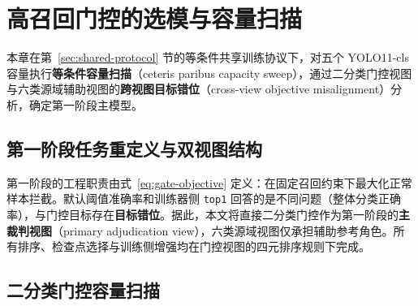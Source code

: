 \documentclass[UTF8,openany,12pt]{ctexbook}
\newcommand{\formalmetric}[1]{\texttt{#1}}
\begin{document}
\chapter{高召回门控的选模与容量扫描}

\noindent 本章在第~\ref{sec:shared-protocol} 节的等条件共享训练协议下，对五个 YOLO11-cls 容量执行\textbf{等条件容量扫描}（ceteris paribus capacity sweep），通过二分类门控视图与六类源域辅助视图的\textbf{跨视图目标错位}（cross-view objective misalignment）分析，确定第一阶段主模型。

\section{第一阶段任务重定义与双视图结构}
第一阶段的工程职责由式~\eqref{eq:gate-objective} 定义：在固定召回约束下最大化正常样本拦截。默认阈值准确率和训练器侧 \formalmetric{top1} 回答的是不同问题（整体分类正确率），与门控目标存在\textbf{目标错位}。据此，本文将直接二分类门控作为第一阶段的\textbf{主裁判视图}（primary adjudication view），六类源域视图仅承担辅助参考角色。所有排序、检查点选择与训练侧增强均在门控视图的四元排序规则下完成。

\section{二分类门控容量扫描}
\begin{table}[H]
    \centering
    \caption{等条件共享协议下的二分类门控容量扫描（扩展验证集，707 正常样本）。\texttt{yolo11s-cls} 以 Spec@R99.5 = 0.3395 排在第一，\texttt{yolo11n-cls} 紧随其后（0.3267）。基线容量排序在扩展验证集上发生变化，但差距极小。\textbf{加粗}为 best，\underline{下划线}为 second-best。}
    \label{tab:stage1-formal-gate-capacity}
\end{table}
\end{document}
